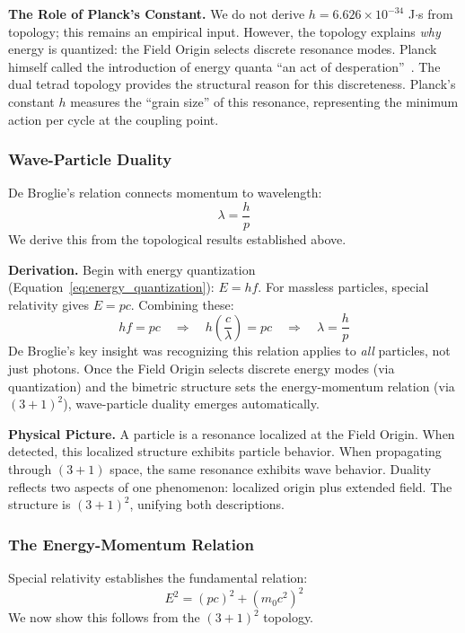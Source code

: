 \documentclass[aps,prd,preprint,superscriptaddress,showpacs,preprintnumbers,amsmath,amssymb,nofootinbib]{revtex4-2}
\begin{document}
\textbf{The Role of Planck's Constant.}
We do not derive $h = 6.626 \times 10^{-34}$ J$\cdot$s from topology; this remains an empirical input. However, the topology explains \emph{why} energy is quantized: the Field Origin selects discrete resonance modes. Planck himself called the introduction of energy quanta ``an act of desperation''~\cite{planck1931}. The dual tetrad topology provides the structural reason for this discreteness. Planck's constant $h$ measures the ``grain size'' of this resonance, representing the minimum action per cycle at the coupling point.

\subsubsection*{Wave-Particle Duality}

De Broglie's relation connects momentum to wavelength:
\begin{equation}
\lambda = \frac{h}{p}
\label{eq:debroglie}
\end{equation}
We derive this from the topological results established above.

\textbf{Derivation.}
Begin with energy quantization (Equation~\ref{eq:energy_quantization}): $E = hf$. For massless particles, special relativity gives $E = pc$. Combining these:
\begin{equation}
hf = pc \quad \Rightarrow \quad h\left(\frac{c}{\lambda}\right) = pc \quad \Rightarrow \quad \lambda = \frac{h}{p}
\end{equation}
De Broglie's key insight was recognizing this relation applies to \emph{all} particles, not just photons. Once the Field Origin selects discrete energy modes (via quantization) and the bimetric structure sets the energy-momentum relation (via $(3+1)^2$), wave-particle duality emerges automatically.

\textbf{Physical Picture.}
A particle is a resonance localized at the Field Origin. When detected, this localized structure exhibits particle behavior. When propagating through $(3+1)$ space, the same resonance exhibits wave behavior. Duality reflects two aspects of one phenomenon: localized origin plus extended field. The structure is $(3+1)^2$, unifying both descriptions.

\subsubsection*{The Energy-Momentum Relation}

Special relativity establishes the fundamental relation:
\begin{equation}
E^2 = (pc)^2 + (m_0 c^2)^2
\label{eq:energy_momentum}
\end{equation}
We now show this follows from the $(3+1)^2$ topology.
\end{document}
